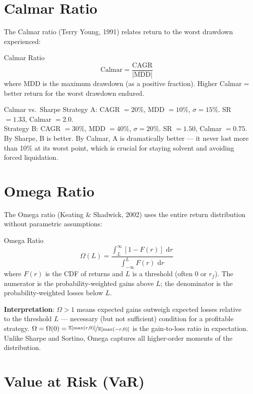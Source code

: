 \documentclass[12pt,a4paper,openany]{report}
\theoremstyle{definition}
\newcommand{\E}{\mathbb{E}}
\newcommand{\dd}{\,\mathrm{d}}
\begin{document}
\section{Calmar Ratio}

The Calmar ratio (Terry Young, 1991) relates return to the worst drawdown experienced:

\begin{definitionbox}{Calmar Ratio}
\[
  \text{Calmar} = \frac{\text{CAGR}}{|\text{MDD}|}
\]
where MDD is the maximum drawdown (as a positive fraction). Higher Calmar = better return for the worst drawdown endured.
\end{definitionbox}

\begin{examplebox}{Calmar vs.\ Sharpe}
Strategy A: CAGR $= 20\%$, MDD $= 10\%$, $\sigma = 15\%$. SR $= 1.33$, Calmar $= 2.0$. \\
Strategy B: CAGR $= 30\%$, MDD $= 40\%$, $\sigma = 20\%$. SR $= 1.50$, Calmar $= 0.75$. \\
By Sharpe, B is better. By Calmar, A is dramatically better — it never lost more than 10\% at its worst point, which is crucial for staying solvent and avoiding forced liquidation.
\end{examplebox}

\section{Omega Ratio}

The Omega ratio (Keating \& Shadwick, 2002) uses the entire return distribution without parametric assumptions:

\begin{definitionbox}{Omega Ratio}
\[
  \Omega(L) = \frac{\int_L^{\infty} [1 - F(r)]\,\dd r}{\int_{-\infty}^L F(r)\,\dd r}
\]
where $F(r)$ is the CDF of returns and $L$ is a threshold (often 0 or $r_f$). The numerator is the probability-weighted gains above $L$; the denominator is the probability-weighted losses below $L$.
\end{definitionbox}

\textbf{Interpretation}: $\Omega > 1$ means expected gains outweigh expected losses relative to the threshold $L$ — necessary (but not sufficient) condition for a profitable strategy. $\Omega = \Omega(0) = \nicefrac{\E[\max(r,0)]}{\E[\max(-r,0)]}$ is the gain-to-loss ratio in expectation. Unlike Sharpe and Sortino, Omega captures all higher-order moments of the distribution.

\section{Value at Risk (VaR)}
\end{document}
